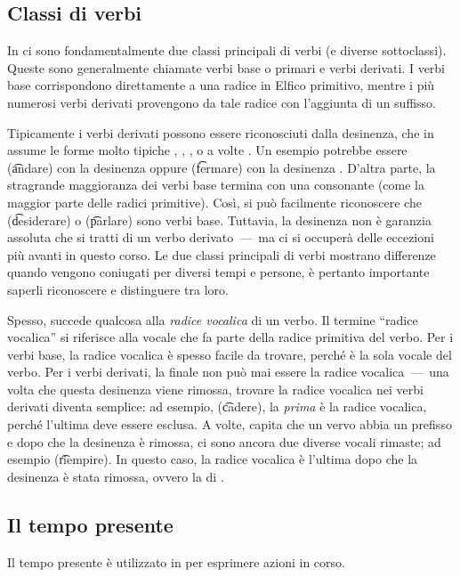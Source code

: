 \subsection{Classi di verbi}
In \quenya ci sono fondamentalmente due classi principali di verbi (e diverse
sottoclassi). Queste sono generalmente chiamate verbi base o primari e verbi
derivati. I verbi base corrispondono direttamente a una radice in Elfico
primitivo, mentre i più numerosi verbi derivati provengono da tale radice con
l'aggiunta di un suffisso.

Tipicamente i verbi derivati possono essere riconosciuti dalla desinenza, che
in \quenya assume le forme molto tipiche , , ,  o
a volte .
Un esempio potrebbe essere  (\t{andare}) con la desinenza 
oppure  (\t{fermare}) con la desinenza . D'altra parte, la
stragrande maggioranza dei verbi base termina con una consonante (come la
maggior parte delle radici primitive).
Così, si può facilmente riconoscere che  (\t{desiderare}) o
 (\t{parlare}) sono verbi base. Tuttavia, la desinenza  non è
garanzia assoluta che si tratti di un verbo derivato~---~ma ci si occuperà
delle eccezioni più avanti in questo corso.
Le due classi principali di verbi mostrano differenze quando vengono coniugati
per diversi tempi e persone, è pertanto importante saperli riconoscere e
distinguere tra loro.

Spesso, succede qualcosa alla \emph{radice vocalica} di un verbo. Il termine
``radice vocalica'' si riferisce alla vocale che fa parte della radice
primitiva del verbo.
Per i verbi base, la radice vocalica è spesso facile da trovare, perché è la
sola vocale del verbo.
Per i verbi derivati, la finale non può mai essere la radice
vocalica~---~una volta che questa desinenza viene rimossa, trovare la radice
vocalica nei verbi derivati diventa semplice:
ad esempio,  (\t{cadere}), la \emph{prima}  è la radice vocalica,
perché l'ultima  deve essere esclusa.
A volte, capita che un vervo abbia un prefisso e dopo che la desinenza è
rimossa, ci sono ancora due diverse vocali rimaste; ad esempio 
(\t{riempire}).
In questo caso, la radice vocalica è l'ultima dopo che la desinenza è stata
rimossa, ovvero la  di .

\subsection{Il tempo presente}
Il tempo presente è utilizzato in \quenya per esprimere azioni in corso.

